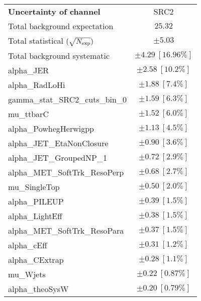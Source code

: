 
\begin{table}
\begin{center}
\setlength{\tabcolsep}{0.0pc}
\begin{tabular*}{\textwidth}{@{\extracolsep{\fill}}lc}
\noalign{\smallskip}\hline\noalign{\smallskip}
{\bf Uncertainty of channel}                                    & SRC2            \\
\noalign{\smallskip}\hline\noalign{\smallskip}
Total background expectation             &  $25.32$       \\
\noalign{\smallskip}\hline\noalign{\smallskip}
Total statistical $(\sqrt{N_{\rm exp}})$              & $\pm 5.03$       \\
Total background systematic               & $\pm 4.29\ [16.96\%] $             \\
\noalign{\smallskip}\hline\noalign{\smallskip}
\noalign{\smallskip}\hline\noalign{\smallskip}
alpha\_JER         & $\pm 2.58\ [10.2\%] $       \\
alpha\_RadLoHi         & $\pm 1.88\ [7.4\%] $       \\
gamma\_stat\_SRC2\_cuts\_bin\_0         & $\pm 1.59\ [6.3\%] $       \\
mu\_ttbarC         & $\pm 1.52\ [6.0\%] $       \\
alpha\_PowhegHerwigpp         & $\pm 1.13\ [4.5\%] $       \\
alpha\_JET\_EtaNonClosure         & $\pm 0.90\ [3.6\%] $       \\
alpha\_JET\_GroupedNP\_1         & $\pm 0.72\ [2.9\%] $       \\
alpha\_MET\_SoftTrk\_ResoPerp         & $\pm 0.68\ [2.7\%] $       \\
mu\_SingleTop         & $\pm 0.50\ [2.0\%] $       \\
alpha\_PILEUP         & $\pm 0.39\ [1.5\%] $       \\
alpha\_LightEff         & $\pm 0.38\ [1.5\%] $       \\
alpha\_MET\_SoftTrk\_ResoPara         & $\pm 0.37\ [1.5\%] $       \\
alpha\_cEff         & $\pm 0.31\ [1.2\%] $       \\
alpha\_CExtrap         & $\pm 0.28\ [1.1\%] $       \\
mu\_Wjets         & $\pm 0.22\ [0.87\%] $       \\
alpha\_theoSysW         & $\pm 0.20\ [0.79\%] $       \\

\end{tabular*}
\end{center}
\end{table}
